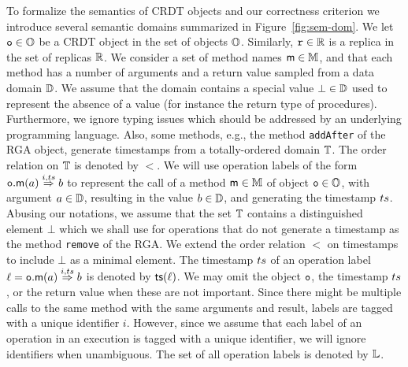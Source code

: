 To formalize the semantics of CRDT objects and our correctness
criterion we introduce several semantic domains summarized
in Figure~\ref{fig:sem-dom}.
%
We let $\mathtt{o} \in \mathbb{O}$ be a CRDT object in the set of objects
$\mathbb{O}$.
Similarly, $\mathtt{r} \in \mathbb{R}$ is a replica in the set of replicas
$\mathbb{R}$.
%
We consider a set of method names $\mathsf{m} \in \mathbb{M}$, and that
each method has a number of arguments and a return value sampled from
a data domain $\mathbb{D}$.
%
We assume that the domain contains a special value $\bot \in
\mathbb{D}$ used to represent the absence of a value (for instance
the return type of procedures).
%
%
Furthermore, we ignore typing issues which should be
addressed by an underlying programming language.
Also, some methods, e.g., the method {\tt addAfter} of the RGA object, generate timestamps from a
totally-ordered domain $\mathbb{T}$. The order relation on $\mathbb{T}$ is denoted by $<$.
%
We will use operation labels of the form
${{\mathtt{o}.\mathsf{m}}}(a) \overset{i,ts}{\Rightarrow} b$ to represent the call of a
method $\mathsf{m} \in \mathbb{M}$ of object $\mathtt{o}\in \mathbb{O}$, with
argument $a \in \mathbb{D}$, resulting in the value $b \in
\mathbb{D}$, and generating the timestamp $ts$.
Abusing our notations, we assume that the set $\mathbb{T}$
contains a distinguished element $\bot$ which we shall use for
operations that do not generate a timestamp as the method {\tt remove}
of the RGA.
We extend the order relation $<$ on timestamps to include $\bot$ as a
minimal element.
The timestamp $ts$ of an operation label $\ell={{\mathtt{o}.\mathsf{m}}}(a) \overset{i,ts}{\Rightarrow} b$
is denoted by $\mathsf{ts}(\ell)$.
We may omit the object $\mathtt{o}$, the timestamp $ts$, or the return
value when these are not important.
Since there might be multiple calls to the same method with the same
arguments and result, labels are tagged with a unique identifier $i$.
However, since we assume that each label of an operation in an
execution is tagged with a unique identifier, we will ignore
identifiers when unambiguous.
The set of all operation labels is denoted by $\mathbb{L}$.
%


